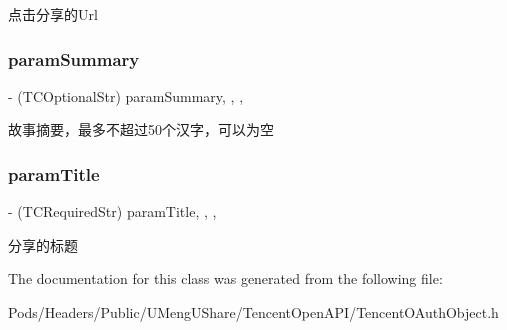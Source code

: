 点击分享的\+Url \mbox{\label{interface_t_c_send_story_dic_a07dcb7266c719afe600ada472aa8c918}} 
\subsubsection{\texorpdfstring{param\+Summary}{paramSummary}}
{\footnotesize\ttfamily -\/ (T\+C\+Optional\+Str) param\+Summary\hspace{0.3cm}{\ttfamily [read]}, {\ttfamily [write]}, {\ttfamily [nonatomic]}, {\ttfamily [retain]}}

故事摘要，最多不超过50个汉字，可以为空 \mbox{\label{interface_t_c_send_story_dic_a50bde2af9cf463544fe1499c25b15fab}} 
\subsubsection{\texorpdfstring{param\+Title}{paramTitle}}
{\footnotesize\ttfamily -\/ (T\+C\+Required\+Str) param\+Title\hspace{0.3cm}{\ttfamily [read]}, {\ttfamily [write]}, {\ttfamily [nonatomic]}, {\ttfamily [retain]}}

分享的标题 

The documentation for this class was generated from the following file\+:\begin{DoxyCompactItemize}
\item 
Pods/\+Headers/\+Public/\+U\+Meng\+U\+Share/\+Tencent\+Open\+A\+P\+I/Tencent\+O\+Auth\+Object.\+h\end{DoxyCompactItemize}
